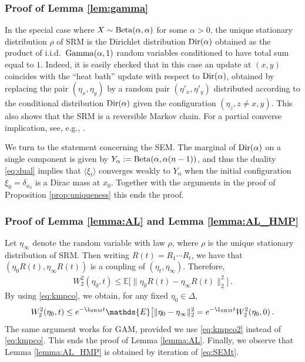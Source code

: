 \documentclass[11pt,reqno]{amsart}
\theoremstyle{remark}
\theoremstyle{definition}
\numberwithin{equation}{section}
\numberwithin{figure}{section}
\newcommand{\E}{\mathds{E}}
\let\a=\alpha \let\b=\beta  \let\c=\chi \let\d=\delta  \let\e=\varepsilon
\let\r=\rho  \let\s=\sigma \let\t=\tau   \let\th=\vartheta
\let\D=\Delta \let\F=\Phi  \let\G=\Gamma  \let\L=\Lambda \let\The=\Theta
\begin{document}
\subsubsection{Proof of Lemma \ref{lem:gamma}}
In the special case where $X\sim{\rm Beta}(\alpha,\alpha)$ for some $\a>0$, the unique stationary distribution $\r$ of SRM is the  Dirichlet distribution ${\rm Dir}(\a)$ obtained as the product of i.i.d.\  ${\rm Gamma}(\alpha,1)$ random variables conditioned to have total sum equal to $1$. Indeed, it is easily checked that in this case an update at $(x,y)$ coincides with the ``heat bath'' update with respect to ${\rm Dir}(\a)$, obtained by replacing the pair $(\eta_x,\eta_y)$ by a random pair $(\eta'_x,\eta'_y)$ distributed according to the conditional distribution ${\rm Dir}(\a)$ given the configuration $(\eta_z, z\neq x,y)$. This also shows that the SRM is a reversible Markov chain. For a partial converse implication, see, e.g., \cite{grigo_mixing_2012}.

We turn to the statement concerning the SEM. The marginal of ${\rm Dir}(\a)$ on a single component is given by $Y_\a:={\rm Beta}(\alpha,\alpha(n-1))$, and thus the duality \eqref{eq:dual} implies that $\langle \xi_t \rangle$ converges weakly to $Y_\a$ when the initial configuration $\xi_0=\d_{x_0}$ is a Dirac mass at  $x_0$. Together with the arguments in the proof of  Proposition \ref{prop:uniqueness} this ends the proof. 

\subsubsection{Proof of Lemma \ref{lemma:AL} and Lemma \ref{lemma:AL_HMP}}\label{sec:proof-L2-contraction}
 Let $\eta_\infty$ denote the random variable with law $\r$, where $\r$ is the unique stationary distribution of SRM. Then writing $R(t)=R_1\cdots R_t$, we have that $(\eta_0R(t),\eta_\infty R(t))$ is a coupling of $(\eta_t,\eta_\infty)$. Therefore, 
\begin{align}\label{W2-con}
	W^2_2(\eta_0,t)\le	
	\E\big[\| \eta_0R(t) - \eta_\infty R(t)\|^2_2\big]\,.
\end{align}
By using \eqref{eq:kmpco}, we obtain, for any fixed $\eta_0\in\D$,  
\[W^2_2(\eta_0,t)\le e^{-\l_{\rm SRM}t}\E\big[\| \eta_0 - \eta_\infty \|^2_2 = e^{-\l_{\rm SRM}t} W^2_2(\eta_0,0)\,.
\]
The same argument works for GAM, provided we use \eqref{eq:kmpco2} instead of  \eqref{eq:kmpco}. This ends the proof of Lemma \ref{lemma:AL}.
Finally, we observe that Lemma \ref{lemma:AL_HMP} is obtained by iteration of \eqref{eq:SEMt}.
\end{document}
